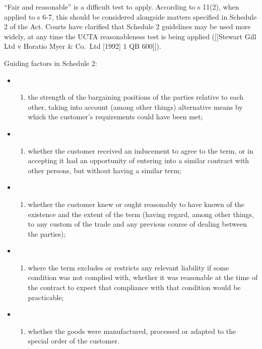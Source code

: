 \documentclass[
]{article}
\providecommand{\tightlist}{%
  \setlength{\itemsep}{0pt}\setlength{\parskip}{0pt}}
\begin{document}
``Fair and reasonable'' is a difficult test to apply. According to s
11(2), when applied to s 6-7, this should be considered alongside
matters specified in Schedule 2 of the Act. Courts have clarified that
Schedule 2 guidelines may be used more widely, at any time the UCTA
reasonableness test is being applied ({[}{[}Stewart Gill Ltd v Horatio
Myer \& Co.~Ltd {[}1992{]} 1 QB 600{]}{]}).

Guiding factors in Schedule 2:

\begin{itemize}
\item
  \begin{enumerate}
  \def\labelenumi{(\alph{enumi})}
  \tightlist
  \item
    the strength of the bargaining positions of the parties relative to
    each other, taking into account (among other things) alternative
    means by which the customer's requirements could have been met;
  \end{enumerate}
\item
  \begin{enumerate}
  \def\labelenumi{(\alph{enumi})}
  \setcounter{enumi}{1}
  \tightlist
  \item
    whether the customer received an inducement to agree to the term, or
    in accepting it had an opportunity of entering into a similar
    contract with other persons, but without having a similar term;
  \end{enumerate}
\item
  \begin{enumerate}
  \def\labelenumi{(\alph{enumi})}
  \setcounter{enumi}{2}
  \tightlist
  \item
    whether the customer knew or ought reasonably to have known of the
    existence and the extent of the term (having regard, among other
    things, to any custom of the trade and any previous course of
    dealing between the parties);
  \end{enumerate}
\item
  \begin{enumerate}
  \def\labelenumi{(\alph{enumi})}
  \setcounter{enumi}{3}
  \tightlist
  \item
    where the term excludes or restricts any relevant liability if some
    condition was not complied with, whether it was reasonable at the
    time of the contract to expect that compliance with that condition
    would be practicable;
  \end{enumerate}
\item
  \begin{enumerate}
  \def\labelenumi{(\alph{enumi})}
  \setcounter{enumi}{4}
  \tightlist
  \item
    whether the goods were manufactured, processed or adapted to the
    special order of the customer.
  \end{enumerate}
\end{itemize}
\end{document}
